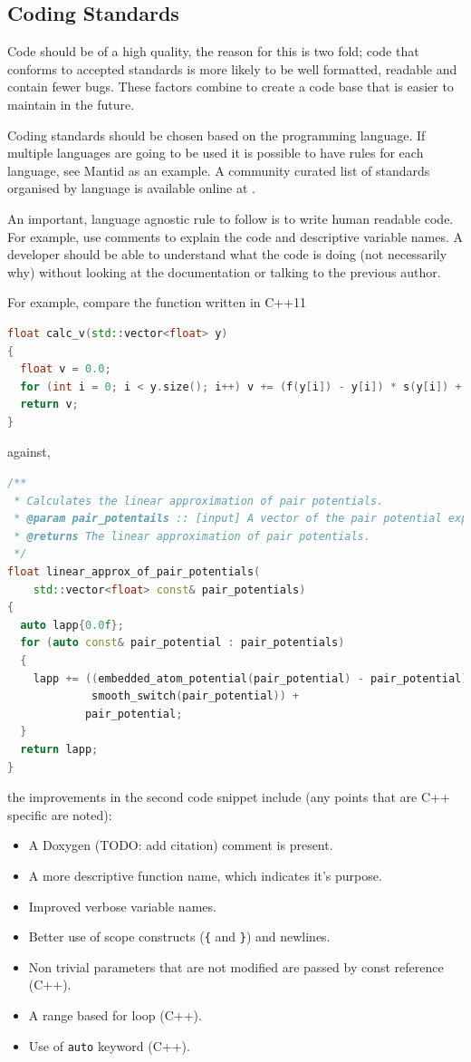 \documentclass[jnr]{iosart2x}
\begin{document}
\subsection{Coding Standards}
\label{Coding standards}

Code should be of a high quality, the reason for this is two fold; code that conforms to accepted standards is more likely to be well formatted, readable and contain fewer bugs.
These factors combine to create a code base that is easier to maintain in the future.

Coding standards should be chosen based on the programming language.
If multiple languages are going to be used it is possible to have rules for each language, see Mantid as an example.
A community curated list of standards organised by language is available online at \cite{Awesome_Guidelines}.

An important, language agnostic rule to follow is to write human readable code.
For example, use comments to explain the code and descriptive variable names.
A developer should be able to understand what the code is doing (not necessarily why) without looking at the documentation or talking to the previous author.

For example, compare the function \cite{Lim_2015} written in C++11

\begin{lstlisting}[frame=single, language=C++]
float calc_v(std::vector<float> y)
{
  float v = 0.0;
  for (int i = 0; i < y.size(); i++) v += (f(y[i]) - y[i]) * s(y[i]) + y[i];
  return v;
}
\end{lstlisting}
against,
\begin{lstlisting}[frame=single, language=C++]
/**
 * Calculates the linear approximation of pair potentials.
 * @param pair_potentails :: [input] A vector of the pair potential experienced by each atom.
 * @returns The linear approximation of pair potentials.
 */
float linear_approx_of_pair_potentials(
    std::vector<float> const& pair_potentials)
{
  auto lapp{0.0f};
  for (auto const& pair_potential : pair_potentials)
  {
    lapp += ((embedded_atom_potential(pair_potential) - pair_potential) *
             smooth_switch(pair_potential)) +
            pair_potential;
  }
  return lapp;
}
\end{lstlisting}

the improvements in the second code snippet include (any points that are C++ specific are noted):
\begin{itemize}
  \item{A Doxygen \cite{} (TODO: add citation) comment is present.}
  \item{A more descriptive function name, which indicates it's purpose.}
  \item{Improved verbose variable names.}
  \item{Better use of scope constructs (\texttt{\{} and \texttt{\}}) and newlines.}
  \item{Non trivial parameters that are not modified are passed by const reference (C++).}
  \item{A range based for loop (C++).}
  \item{Use of \texttt{auto} keyword (C++).}
\end{itemize}
\end{document}
